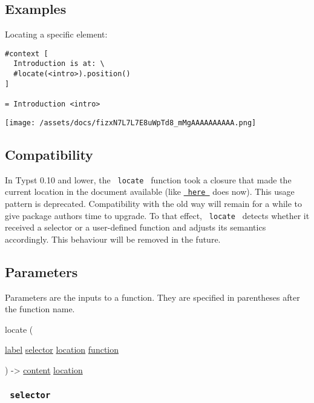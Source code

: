 \subsection{Examples}\label{examples}

Locating a specific element:

\begin{verbatim}
#context [
  Introduction is at: \
  #locate(<intro>).position()
]

= Introduction <intro>
\end{verbatim}

\texttt{[image: /assets/docs/fizxN7L7L7E8uWpTd8\_mMgAAAAAAAAAA.png]}

\subsection{Compatibility}\label{compatibility}

In Typst 0.10 and lower, the \texttt{\ locate\ } function took a closure
that made the current location in the document available (like
\href{/docs/reference/introspection/here/}{\texttt{\ here\ }} does now).
This usage pattern is deprecated. Compatibility with the old way will
remain for a while to give package authors time to upgrade. To that
effect, \texttt{\ locate\ } detects whether it received a selector or a
user-defined function and adjusts its semantics accordingly. This
behaviour will be removed in the future.

\subsection{\texorpdfstring{{ Parameters
}}{ Parameters }}\label{parameters}

\label{parameters-tooltip}
Parameters are the inputs to a function. They are specified in
parentheses after the function name.

{ locate } (

{ \href{/docs/reference/foundations/label/}{label}
\href{/docs/reference/foundations/selector/}{selector}
\href{/docs/reference/introspection/location/}{location}
\href{/docs/reference/foundations/function/}{function} }

) -\textgreater{} \href{/docs/reference/foundations/content/}{content}
\href{/docs/reference/introspection/location/}{location}

\subsubsection{\texorpdfstring{\texttt{\ selector\ }}{ selector }}\label{parameters-selector}

